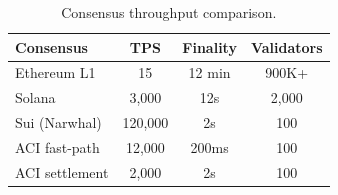 \begin{table}[H]
\centering
\small
\begin{tabular}{lccc}
\toprule
\textbf{Consensus} & \textbf{TPS} & \textbf{Finality} & \textbf{Validators} \\
\midrule
Ethereum L1 & 15 & 12 min & 900K+ \\
Solana & 3,000 & 12s & 2,000 \\
Sui (Narwhal) & 120,000 & 2s & 100 \\
ACI fast-path & 12,000 & 200ms & 100 \\
ACI settlement & 2,000 & 2s & 100 \\
\bottomrule
\end{tabular}
\caption{Consensus throughput comparison.}
\label{tab:consensus}
\end{table}

